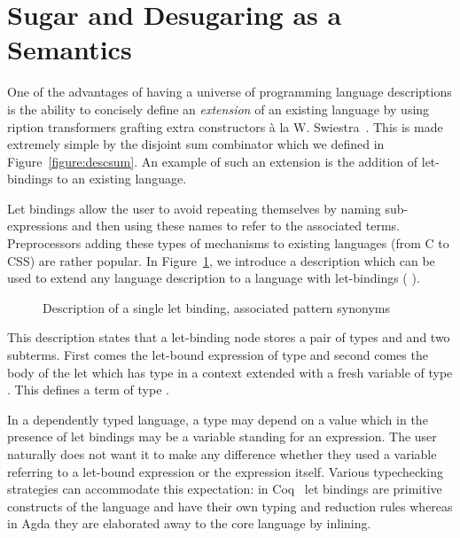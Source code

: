 \section{Sugar and Desugaring as a Semantics}\label{section:letbinding}

One of the advantages of having a universe of programming language
descriptions is the ability to concisely define an \emph{extension}
of an existing language by using ription transformers
grafting extra constructors à la W. Swiestra~\citeyear{swierstra_2008}.
This is made extremely simple by the disjoint sum combinator
 which we defined in Figure~\ref{figure:descsum}.
An example of such an extension is the addition of let-bindings to
an existing language.

Let bindings allow the user to avoid repeating themselves by naming
sub-expressions and then using these names to refer to the associated
terms. Preprocessors adding these types of mechanisms to existing
languages (from C to CSS) are rather popular. In Figure~\ref{defn:letD},
we introduce a description  which can be used to extend any
language description  to a language with let-bindings
(  ).

\begin{figure}[h]
\begin{minipage}[t]{0.45\textwidth}
\end{minipage}
\begin{minipage}[t]{0.45\textwidth}
\end{minipage}
\caption{Description of a single let binding, associated pattern synonyms
  \label{defn:letD}}
\end{figure}

This description states that a let-binding node stores a pair of types
 and  and two subterms. First comes the let-bound
expression of type  and second comes the body of the let which
has type  in a context extended with a fresh variable of type
. This defines a term of type .

In a dependently typed language, a type may depend on a value which
in the presence of let bindings may be a variable standing for an
expression. The user naturally does not want it to make any difference
whether they used a variable referring to a let-bound expression or
the expression itself. Various typechecking strategies can accommodate
this expectation: in Coq~\cite{Coq:manual} let bindings are primitive
constructs of the language and have their own typing and reduction
rules whereas in Agda they are elaborated away to the core language
by inlining.

